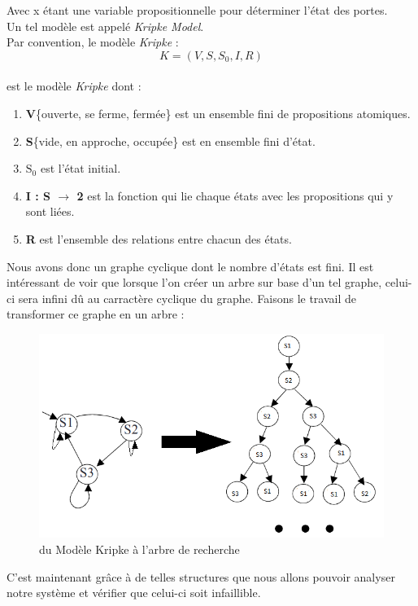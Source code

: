 \documentclass[runningheads,a4paper]{llncs}
\begin{document}
\noindent Avec x étant une variable propositionnelle pour déterminer l'état des portes.\\
Un tel modèle est appelé \textit{Kripke Model}.\\
Par convention, le modèle \textit{Kripke} : $$K = (V, S, S_{0}, I, R)$$ \\
est le modèle \textit{Kripke} dont :
\begin{enumerate}
\item \textbf{V}\{ouverte, se ferme, fermée\} est un ensemble fini de propositions atomiques.
\item \textbf{S}\{vide, en approche, occupée\} est en ensemble fini d'état.
\item \textbf{$\textrm{S}_\textrm{0}$} est l'état initial.
\item \textbf{I : S $\rightarrow$ 2} est la fonction qui lie chaque états avec les propositions qui y sont liées.
\item \textbf{R} est l'ensemble des relations entre chacun des états.
\end{enumerate}

\noindent Nous avons donc un graphe cyclique dont le nombre d'états est fini. Il est intéressant de voir que lorsque l'on créer un arbre sur base d'un tel graphe, celui-ci sera infini dû au carractère cyclique du graphe. Faisons le travail de transformer ce graphe en un arbre : 
\begin{figure}[!h]
	\includegraphics[scale=0.4]{kripke.png}
	\centering
	\caption{du Modèle Kripke à l'arbre de recherche}
	\label{label-image4}
\end{figure}

\noindent C'est maintenant grâce à de telles structures que nous allons pouvoir analyser notre système et vérifier que celui-ci soit infaillible.
\end{document}
